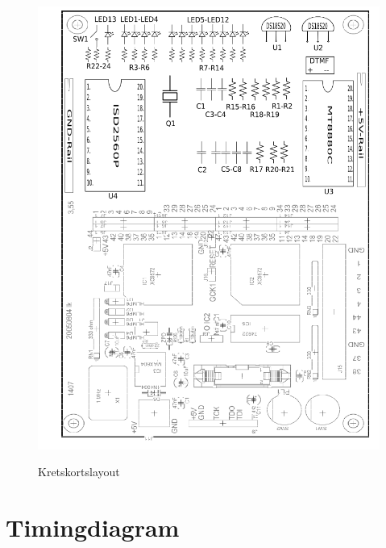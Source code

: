 \documentclass[a4paper,11pt]{article}
\begin{document}
	\begin{figure}[H]
	  \centering
	      \includegraphics[scale=0.60, angle=0]{Layout.png}
		\label{fig:layout}
	  	\caption{Kretskortslayout}
	\end{figure}
	
	\section{Timingdiagram}
\end{document}
